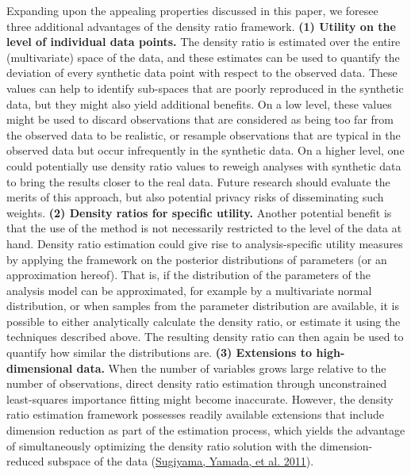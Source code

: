 \documentclass[
]{template/style/uneceart}
\begin{document}
Expanding upon the appealing properties discussed in this paper, we
foresee three additional advantages of the density ratio framework.
\textbf{(1) Utility on the level of individual data points.} The density
ratio is estimated over the entire (multivariate) space of the data, and
these estimates can be used to quantify the deviation of every synthetic
data point with respect to the observed data. These values can help to
identify sub-spaces that are poorly reproduced in the synthetic data,
but they might also yield additional benefits. On a low level, these
values might be used to discard observations that are considered as
being too far from the observed data to be realistic, or resample
observations that are typical in the observed data but occur
infrequently in the synthetic data. On a higher level, one could
potentially use density ratio values to reweigh analyses with synthetic
data to bring the results closer to the real data. Future research
should evaluate the merits of this approach, but also potential privacy
risks of disseminating such weights. \textbf{(2) Density ratios for
specific utility.} Another potential benefit is that the use of the
method is not necessarily restricted to the level of the data at hand.
Density ratio estimation could give rise to analysis-specific utility
measures by applying the framework on the posterior distributions of
parameters (or an approximation hereof). That is, if the distribution of
the parameters of the analysis model can be approximated, for example by
a multivariate normal distribution, or when samples from the parameter
distribution are available, it is possible to either analytically
calculate the density ratio, or estimate it using the techniques
described above. The resulting density ratio can then again be used to
quantify how similar the distributions are. \textbf{(3) Extensions to
high-dimensional data.} When the number of variables grows large
relative to the number of observations, direct density ratio estimation
through unconstrained least-squares importance fitting might become
inaccurate. However, the density ratio estimation framework possesses
readily available extensions that include dimension reduction as part of
the estimation process, which yields the advantage of simultaneously
optimizing the density ratio solution with the dimension-reduced
subspace of the data
(\protect\hyperlink{ref-sugiyama_lhss_2011}{Sugiyama, Yamada, et al.
2011}).
\end{document}
